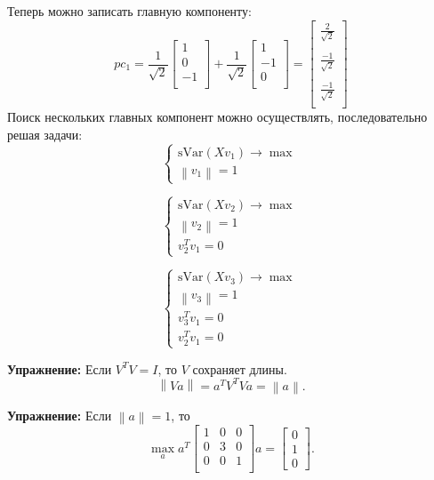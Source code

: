 \documentclass[12pt]{article} %
\theoremstyle{definition} %
\begin{document}
Теперь можно записать главную компоненту:
$$pc_1 =
\frac{1}{\sqrt{2}} \begin{bmatrix}
1\\
0\\
-1\\
\end{bmatrix}
+
\frac{1}{\sqrt{2}} \begin{bmatrix}
1\\
-1\\
0\\
\end{bmatrix}
=
\begin{bmatrix}
\frac{2}{\sqrt{2}}\\~\\
\frac{-1}{\sqrt{2}}\\~\\
\frac{-1}{\sqrt{2}}\\
\end{bmatrix}
$$
Поиск нескольких главных компонент можно осуществлять, последовательно решая задачи:
$$
\begin{cases}
\text{sVar}(Xv_1) \to \max \\
\left\| v_1 \right\| = 1
\end{cases}
$$

$$
\begin{cases}
\text{sVar}(Xv_2) \to \max \\
\left\| v_2 \right\| = 1 \\
v_2^Tv_1 = 0
\end{cases}
$$

$$
\begin{cases}
\text{sVar}(Xv_3) \to \max \\
\left\| v_3 \right\| = 1 \\
v_3^Tv_1 = 0\\
v_2^Tv_1 = 0
\end{cases}
$$

\textbf{Упражнение:} Если $V^TV=I$, то $V$ сохраняет длины.
$$\left\| Va \right\| = a^TV^TVa = \left\| a \right\|.$$

\textbf{Упражнение:} Если $\left\| a \right\| = 1$,
то
$$\max_a a^T 
\begin{bmatrix}
1 & 0 & 0 \\
0 & 3 & 0 \\
0 & 0 & 1 \\
\end{bmatrix} 
a = 
\begin{bmatrix}
0\\
1\\
0
\end{bmatrix}.
$$
\end{document}
